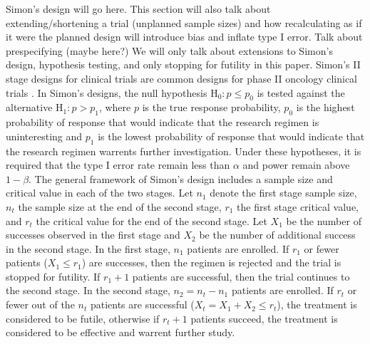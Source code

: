 \documentclass[12pt]{report}\usepackage[]{graphicx}\usepackage[]{color}
\newlength{\li}\setlength{\li}{14.48pt}
\newlength{\di}\setlength{\di}{-3.5mm}
\begin{document}
Simon's design will go here. This section will also talk about extending/shortening a trial (unplanned sample sizes) and how recalculating as if it were the planned design will introduce bias and inflate type I error. Talk about prespecifying (maybe here?)
\newline
We will only talk about extensions to Simon's design, hypothesis testing, and only stopping for futility in this paper.  
\newline
\textbf{}
\newline
\indent Simon's II stage designs for clinical trials are common designs for phase II oncology clinical trials \cite{Simon}. In Simon's designs, the null hypothesis $\mbox{H}_0: p \leq p_0$ is tested against the alternative $\mbox{H}_1: p > p_1$, where $p$ is the true response probability, $p_0$ is the highest probability of response that would indicate that the research regimen is uninteresting and $p_1$ is the lowest probability of response that would indicate that the research regimen warrents further investigation. Under these hypotheses, it is required that the type I error rate remain less than $\alpha$ and power remain above $1-\beta$. The general framework of Simon's design includes a sample size and critical value in each of the two stages. Let $n_1$ denote the first stage sample size, $n_t$ the sample size at the end of the second stage, $r_1$ the first stage critical value, and $r_t$ the critical value for the end of the second stage. Let $X_1$ be the number of successes observed in the first stage and $X_2$ be the number of additional success in the second stage. In the first stage, $n_1$ patients are enrolled. If $r_1$ or fewer patients ($X_1 \leq r_1$) are successes, then the regimen is rejected and the trial is stopped for futility. If $r_1 + 1$ patients are successful, then the trial continues to the second stage. In the second stage, $n_2 = n_t - n_1$ patients are enrolled. If $r_t$ or fewer out of the $n_t$ patients are successful ($X_t = X_1 + X_2 \leq r_t$), the treatment is considered to be futile, otherwise if $r_t + 1$ patients succeed, the treatment is considered to be effective and warrent further study.  \\
\end{document}
